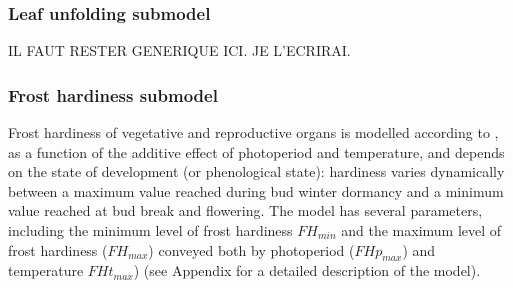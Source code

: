\documentclass[letterpaper,8pt]{extarticle}  %
\begin{document}
\begin{doublespacing}
\begin{linenumbers}
\subsubsection{Leaf unfolding submodel}
IL FAUT RESTER GENERIQUE ICI. JE L'ECRIRAI.



\subsubsection{Frost hardiness submodel}

Frost hardiness of vegetative and reproductive organs is modelled according to \citet{Leinonen1996}, as a function of the additive effect of photoperiod and temperature, and depends on the state of development (or phenological state): hardiness varies dynamically between a maximum value reached during bud winter dormancy and a minimum value reached at bud break and flowering. The model has several parameters, including the minimum level of frost hardiness $FH_{min}$ and the maximum level of frost hardiness ($FH_{max}$) conveyed both by photoperiod ($FHp_{max}$) and temperature $FHt_{max}$)   (see Appendix for a detailed description of the model). 


\end{linenumbers}
\end{doublespacing}
\end{document}
